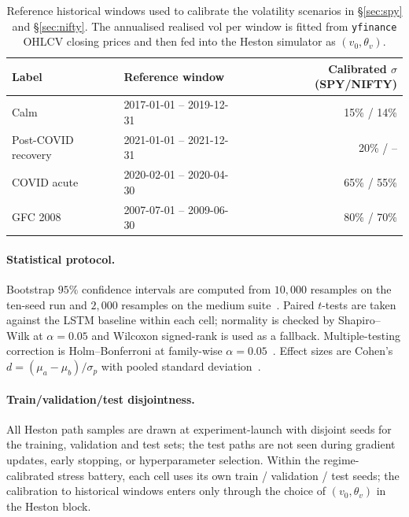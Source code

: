 \documentclass[10pt,letterpaper]{article}
\begin{document}
\begin{table}[ht]
\centering\small
\caption{Reference historical windows used to calibrate the
volatility scenarios in \S\ref{sec:spy} and \S\ref{sec:nifty}.
The annualised realised vol per window is fitted from
\texttt{yfinance} OHLCV closing prices and then fed into the Heston
simulator as $(v_0,\theta_v)$.}
\label{tab:crisis_windows}
\begin{tabular}{@{}llr@{}}
\toprule
\textbf{Label} & \textbf{Reference window} & \textbf{Calibrated $\sigma$ (SPY/NIFTY)} \\\midrule
Calm                   & 2017-01-01 -- 2019-12-31 & 15\% / 14\% \\
Post-COVID recovery    & 2021-01-01 -- 2021-12-31 & 20\% / --  \\
COVID acute            & 2020-02-01 -- 2020-04-30 & 65\% / 55\% \\
GFC 2008               & 2007-07-01 -- 2009-06-30 & 80\% / 70\% \\
\bottomrule
\end{tabular}
\end{table}

\paragraph{Statistical protocol.}
Bootstrap $95\%$ confidence intervals are computed from $10{,}000$
resamples on the ten-seed run and $2{,}000$ resamples on the medium
suite~\citep{efron1979bootstrap}. Paired $t$-tests are taken against
the LSTM baseline within each cell; normality is checked by
Shapiro--Wilk at $\alpha=0.05$ and Wilcoxon signed-rank is used as a
fallback. Multiple-testing correction is Holm--Bonferroni at
family-wise $\alpha=0.05$~\citep{holm1979simple}. Effect sizes are
Cohen's $d=(\mu_a-\mu_b)/\sigma_p$ with pooled standard
deviation~\citep{cohen1988statistical}.

\paragraph{Train/validation/test disjointness.}
All Heston path samples are drawn at experiment-launch with disjoint
seeds for the training, validation and test sets; the test paths are
not seen during gradient updates, early stopping, or hyperparameter
selection. Within the regime-calibrated stress battery, each cell
uses its own train / validation / test seeds; the calibration to
historical windows enters only through the choice of
$(v_0,\theta_v)$ in the Heston block.
\end{document}
